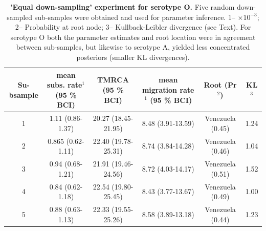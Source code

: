 \documentclass[a4paper,10pt]{article}
\begin{document}
\newpage
\begin{table}
\medskip
\begin{minipage}{\textwidth}
\begin{center}
 \caption{ {{\bf 'Equal down-sampling' experiment for serotype O.}} Five random down-sampled sub-samples were obtained and used for parameter inference.
1-- $\times 10^{-3}$; 2--  Probability at root node; 3-- Kullback-Leibler divergence (see Text).
For serotype O both the parameter estimates and root location were in agreement between sub-samples, but  likewise to serotype A, yielded less concentrated posteriors (smaller KL divergences).}
\begin{tabular}{cccccc}
\toprule
Su-bsample	&mean subs. rate$^{1}$ (95 \% BCI)	&TMRCA (95 \% BCI)	&mean migration rate$^{1}$ (95 \% BCI)	&Root (Pr$^{2}$) & KL$^3$\\
\midrule
1	&1.11 (0.86-1.37)	&20.27 (18.45-21.95)	&8.48 (3.91-13.59)	&Venezuela  (0.45)& 1.24\\
2	&0.865 (0.62-1.11)	&22.40 (19.78-25.31)	&8.74 (3.84-14.28)	&Venezuela  (0.46)&1.04\\
3	&0.94 (0.68-1.21)	&21.91 (19.46-24.56)	&8.72 (4.03-14.17)	&Venezuela  (0.51)&1.52\\
4	&0.84 (0.62-1.18)	&22.54 (19.80-25.45)	&8.43 (3.77-13.67)	&Venezuela  (0.49)&1.00\\
5	&0.88 (0.63-1.13)	&22.33 (19.55-25.26)	&8.58 (3.89-13.18)	&Venezuela  (0.44)&1.23\\
\bottomrule
\end{tabular}
\label{stab:ED_O}
\end{center}
\end{minipage}
\end{table}
\end{document}
